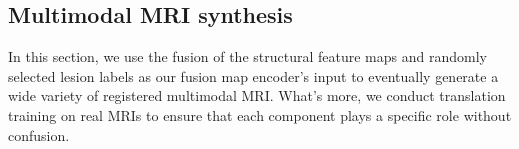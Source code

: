 \documentclass{ecai}
\begin{document}
\subsection{Multimodal MRI synthesis}
In this section, we use the fusion of the structural feature maps and randomly selected lesion labels as our fusion map encoder's input to eventually generate a wide variety of registered multimodal MRI. What's more, we conduct translation training on real MRIs to ensure that each component plays a specific role without confusion.
%
%
\end{document}
